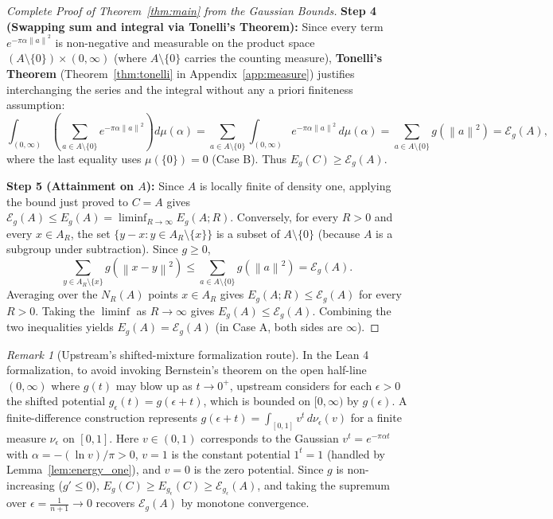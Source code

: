\documentclass[11pt, a4paper]{article}
\theoremstyle{definition}
\theoremstyle{remark}
\newtheorem{remark}[theorem]{Remark}
\newcommand{\Ecal}{\mathcal{E}}
\newcommand{\norm}[1]{\left\lVert #1 \right\rVert}
\begin{document}
\begin{proof}[Complete Proof of Theorem~\ref{thm:main} from the Gaussian Bounds]
\noindent \textbf{Step 4 (Swapping sum and integral via Tonelli's Theorem):} Since every term $e^{-\pi \alpha \norm{a}^2}$ is non-negative and measurable on the product space $(A \setminus \{0\}) \times (0, \infty)$ (where $A \setminus \{0\}$ carries the counting measure), \textbf{Tonelli's Theorem} (Theorem~\ref{thm:tonelli} in Appendix~\ref{app:measure}) justifies interchanging the series and the integral without any a priori finiteness assumption:
\[
\int_{(0, \infty)} \left( \sum_{a \in A \setminus \{0\}} e^{-\pi \alpha \norm{a}^2} \right) d\mu(\alpha) = \sum_{a \in A \setminus \{0\}} \int_{(0, \infty)} e^{-\pi \alpha \norm{a}^2} \, d\mu(\alpha) = \sum_{a \in A \setminus \{0\}} g\left(\norm{a}^2\right) = \Ecal_g(A),
\]
where the last equality uses $\mu(\{0\}) = 0$ (Case B). Thus $E_g(C) \ge \Ecal_g(A)$.

\noindent \textbf{Step 5 (Attainment on $A$):} Since $A$ is locally finite of density one, applying the bound just proved to $C = A$ gives $\Ecal_g(A) \le E_g(A) = \liminf_{R \to \infty} E_g(A; R)$. Conversely, for every $R > 0$ and every $x \in A_R$, the set $\{y - x : y \in A_R \setminus \{x\}\}$ is a subset of $A \setminus \{0\}$ (because $A$ is a subgroup under subtraction). Since $g \ge 0$,
\[
\sum_{y \in A_R \setminus \{x\}} g\left(\norm{x - y}^2\right) \le \sum_{a \in A \setminus \{0\}} g\left(\norm{a}^2\right) = \Ecal_g(A).
\]
Averaging over the $N_R(A)$ points $x \in A_R$ gives $E_g(A; R) \le \Ecal_g(A)$ for every $R > 0$. Taking the $\liminf$ as $R \to \infty$ gives $E_g(A) \le \Ecal_g(A)$. Combining the two inequalities yields $E_g(A) = \Ecal_g(A)$ (in Case A, both sides are $\infty$).
\end{proof}

\begin{remark}[Upstream's shifted-mixture formalization route]
In the Lean 4 formalization, to avoid invoking Bernstein's theorem on the open half-line $(0, \infty)$ where $g(t)$ may blow up as $t \to 0^+$, upstream considers for each $\epsilon > 0$ the shifted potential $g_\epsilon(t) = g(\epsilon + t)$, which is bounded on $[0, \infty)$ by $g(\epsilon)$. A finite-difference construction represents $g(\epsilon + t) = \int_{[0, 1]} v^t \, d\nu_\epsilon(v)$ for a finite measure $\nu_\epsilon$ on $[0, 1]$. Here $v \in (0, 1)$ corresponds to the Gaussian $v^t = e^{-\pi \alpha t}$ with $\alpha = -(\ln v)/\pi > 0$, $v = 1$ is the constant potential $1^t = 1$ (handled by Lemma~\ref{lem:energy_one}), and $v = 0$ is the zero potential. Since $g$ is non-increasing ($g' \le 0$), $E_g(C) \ge E_{g_\epsilon}(C) \ge \Ecal_{g_\epsilon}(A)$, and taking the supremum over $\epsilon = \frac{1}{n+1} \to 0$ recovers $\Ecal_g(A)$ by monotone convergence.
\end{remark}
\end{document}
